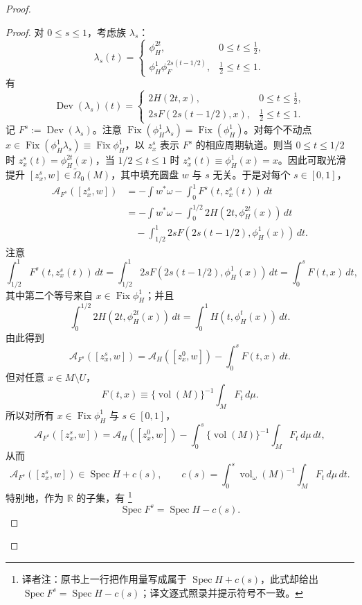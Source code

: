 \begin{proof}
\begin{proof}
对 $0\leq s\leq1$，考虑族 $\lambda_s$：
\[
 \lambda_s(t)=
 \begin{cases}
  \phi_H^{2t},&0\leq t\leq\frac12,\\
  \phi_H^1\phi_F^{2s(t-1/2)},&\frac12\leq t\leq1.
 \end{cases}
\]
有
\[
 \operatorname{Dev}(\lambda_s)(t)=
 \begin{cases}
  2H(2t,x),&0\leq t\leq\frac12,\\
  2sF(2s(t-1/2),x),&\frac12\leq t\leq1.
 \end{cases}
\]
记 $F^s:=\operatorname{Dev}(\lambda_s)$。注意
$\operatorname{Fix}(\phi_H^1\lambda_s)=\operatorname{Fix}(\phi_H^1)$。对每个不动点
$x\in\operatorname{Fix}(\phi_H^1\lambda_s)\equiv\operatorname{Fix}\phi_H^1$，以
$z_x^s$ 表示 $F^s$ 的相应周期轨道。则当 $0\leq t\leq1/2$ 时
$z_x^s(t)=\phi_H^{2t}(x)$，当 $1/2\leq t\leq1$ 时
$z_x^s(t)\equiv\phi_H^1(x)=x$。因此可取光滑提升
$[z_x^s,w]\in\widetilde\Omega_0(M)$，其中填充圆盘 $w$ 与 $s$ 无关。于是对每个
$s\in[0,1]$，
\[
 \begin{aligned}
 \mathcal A_{F^s}([z_x^s,w])
 &=-\int w^*\omega-\int_0^1F^s(t,z_x^s(t))\,dt\\
 &=-\int w^*\omega
 -\int_0^{1/2}2H(2t,\phi_H^{2t}(x))\,dt\\
 &\quad-\int_{1/2}^1 2sF(2s(t-1/2),\phi_H^1(x))\,dt.
 \end{aligned}
\]
注意
\[
 \int_{1/2}^1F^s(t,z_x^s(t))\,dt
 =\int_{1/2}^1 2sF(2s(t-1/2),\phi_H^1(x))\,dt
 =\int_0^sF(t,x)\,dt,
\]
其中第二个等号来自 $x\in\operatorname{Fix}\phi_H^1$；并且
\[
 \int_0^{1/2}2H(2t,\phi_H^{2t}(x))\,dt
 =\int_0^1H(t,\phi_H^t(x))\,dt.
\]
由此得到
\[
 \mathcal A_{F^s}([z_x^s,w])
 =\mathcal A_H([z_x^0,w])-\int_0^sF(t,x)\,dt.
\]
但对任意 $x\in M\setminus U$，
\begin{equation}
 F(t,x)\equiv\{\operatorname{vol}(M)\}^{-1}\int_MF_t\,d\mu.
 \label{eq:22-hamiltonian-outside-support}
\end{equation}
所以对所有 $x\in\operatorname{Fix}\phi_H^1$ 与 $s\in[0,1]$，
\[
 \mathcal A_{F^s}([z_x^s,w])
 =\mathcal A_H([z_x^0,w])
 -\int_0^s\{\operatorname{vol}(M)\}^{-1}\int_MF_t\,d\mu\,dt,
\]
从而
\[
 \mathcal A_{F^s}([z_x^s,w])\in\operatorname{Spec}H+c(s),
 \qquad
 c(s)=\int_0^s\operatorname{vol}_\omega(M)^{-1}\int_MF_t\,d\mu\,dt.
\]
特别地，作为 $\mathbb R$ 的子集，有
\footnote{译者注：原书上一行把作用量写成属于
$\operatorname{Spec}H+c(s)$，此式却给出
$\operatorname{Spec}F^s=\operatorname{Spec}H-c(s)$；译文逐式照录并提示符号不一致。}
\begin{equation}
 \operatorname{Spec}F^s=\operatorname{Spec}H-c(s).
 \label{eq:22-spectrum-shift}
\end{equation}


\end{proof}
\end{proof}
